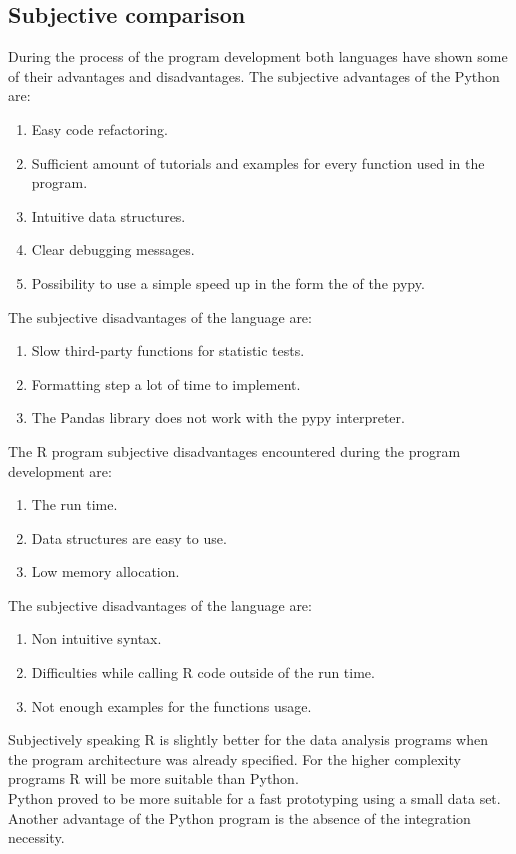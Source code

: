 \documentclass [twoside,
  11pt, a4paper,
  footinclude=true,
  headinclude=true,
  cleardoublepage=empty
]{article}
\begin{document}
\subsection{Subjective comparison}
During the process of the program development both languages have shown some of their advantages and disadvantages. The subjective advantages of the Python are:
\begin{enumerate}
    \item Easy code refactoring.
    \item Sufficient amount of tutorials and examples for every function used in the program.
    \item Intuitive data structures.
    \item Clear debugging messages.
    \item Possibility to use a simple speed up in the form the of the pypy.
\end{enumerate}
The subjective disadvantages of the language are:
\begin{enumerate}
    \item Slow third-party functions for statistic tests.
    \item Formatting step a lot of time to implement.
    \item The Pandas library does not work with the pypy interpreter.
\end{enumerate} 
The R program subjective disadvantages encountered during the program development are:
\begin{enumerate}
    \item The run time.
    \item Data structures are easy to use.
    \item Low memory allocation.
\end{enumerate}
The subjective disadvantages of the language are:
\begin{enumerate}
    \item Non intuitive syntax.
    \item Difficulties while calling R code outside of the run time.
    \item Not enough examples for the functions usage.
\end{enumerate} 
Subjectively speaking R is slightly better for the data analysis programs when the program architecture was already specified. For the higher complexity programs R will be more suitable than Python.\\ 
Python proved to be more suitable for a fast prototyping using a small data set. Another advantage of the Python program is the absence of the integration necessity.
  
\end{document}
